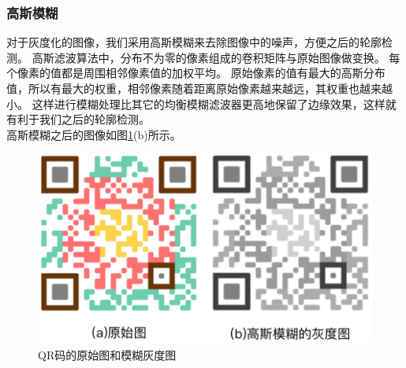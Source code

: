 \subsubsection{高斯模糊}
对于灰度化的图像，我们采用高斯模糊来去除图像中的噪声，方便之后的轮廓检测。
高斯滤波算法中，分布不为零的像素组成的卷积矩阵与原始图像做变换。
每个像素的值都是周围相邻像素值的加权平均。
原始像素的值有最大的高斯分布值，所以有最大的权重，相邻像素随着距离原始像素越来越远，其权重也越来越小。
这样进行模糊处理比其它的均衡模糊滤波器更高地保留了边缘效果，这样就有利于我们之后的轮廓检测。\\
高斯模糊之后的图像如图\ref{fig:blured}(b)所示。
\begin{figure}[h]
\centering
\includegraphics[width=0.9\linewidth]{blured}
\caption[blured]{QR码的原始图和模糊灰度图}
\label{fig:blured}
\end{figure}
